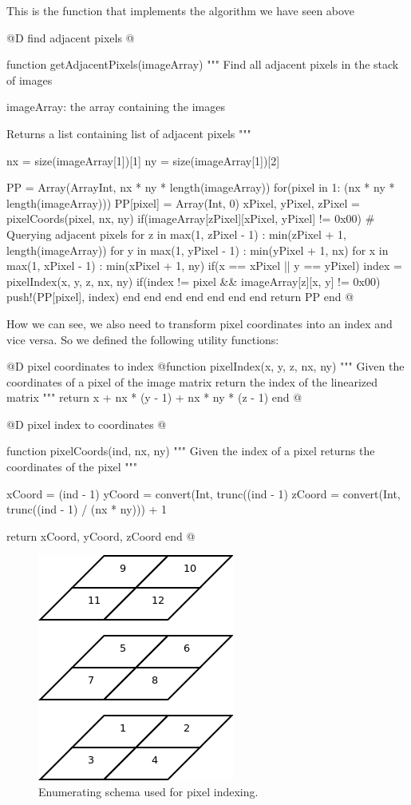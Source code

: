 \documentclass[11pt,oneside]{article}	%
\begin{document}
This is the function that implements the algorithm we have seen above

@D find adjacent pixels
@{function getAdjacentPixels(imageArray)
  """
  Find all adjacent pixels in the stack of images

  imageArray: the array containing the images
  
  Returns a list containing list of adjacent pixels
  """
  
  nx = size(imageArray[1])[1]
  ny = size(imageArray[1])[2]
  
  PP = Array(Array{Int}, nx * ny * length(imageArray))
  for(pixel in 1: (nx * ny * length(imageArray)))
    PP[pixel] = Array(Int, 0)
    xPixel, yPixel, zPixel = pixelCoords(pixel, nx, ny)
    if(imageArray[zPixel][xPixel, yPixel] != 0x00)
      # Querying adjacent pixels
      for z in max(1, zPixel - 1) : min(zPixel + 1, length(imageArray))
        for y in max(1, yPixel - 1) : min(yPixel + 1, nx)
          for x in max(1, xPixel - 1) : min(xPixel + 1, ny)
            if(x == xPixel || y == yPixel)
              index = pixelIndex(x, y, z, nx, ny)
              if(index != pixel && imageArray[z][x, y] != 0x00)
                push!(PP[pixel], index)
              end
            end
          end
        end
      end
    end
  end
  return PP
end @}

How we can see, we also need to transform pixel coordinates into an index and vice versa. So we defined the following utility functions:

@D pixel coordinates to index
@{function pixelIndex(x, y, z, nx, ny)
  """
  Given the coordinates of a pixel
  of the image matrix return the index
  of the linearized matrix
  """
  return x + nx * (y - 1) + nx * ny * (z - 1)
end @}

@D pixel index to coordinates
@{function pixelCoords(ind, nx, ny)
  """
  Given the index of a pixel
  returns the coordinates of the pixel
  """

  xCoord = (ind - 1) %
  yCoord = convert(Int, trunc((ind - 1) %
  zCoord = convert(Int, trunc((ind - 1) / (nx * ny))) + 1

  return xCoord, yCoord, zCoord
end @}

\begin{figure}[htb]
  \begin{center}
    \includegraphics[width=0.25\linewidth]{images/PixelIndexing.png}
  \end{center}
  \caption{Enumerating schema used for pixel indexing.}
  \label{fig:architecture}
\end{figure}
\end{document}
